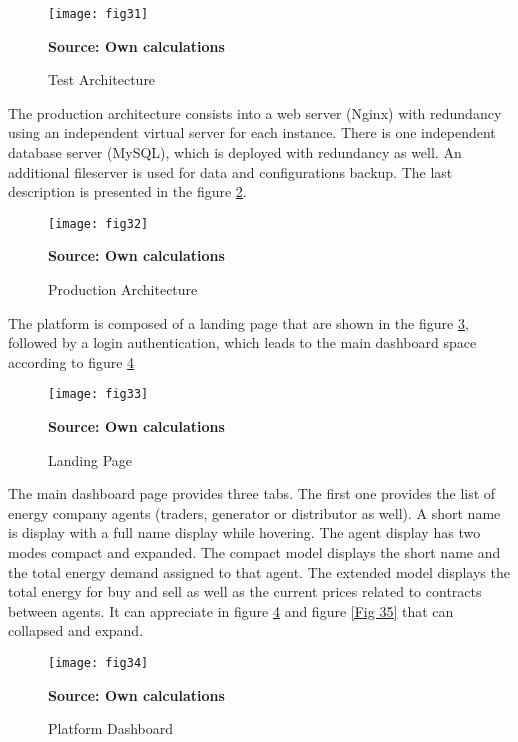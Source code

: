 \documentclass[12pt]{book}
\begin{document}
\begin{figure}  
\centering    
\texttt{[image: fig31]}  
\caption{Test Architecture}
\scriptsize 
\textbf{Source: Own calculations}
\captionsetup{justification=centering,margin=1cm}   
\label{Fig 31}
\end{figure}

The production architecture consists into a web server (Nginx) with redundancy using an independent virtual server for each instance. There is one independent database server (MySQL), which is deployed with redundancy as well. An additional fileserver is used for data and configurations backup. The last description is presented in the figure \ref{Fig 32}. 

\begin{figure}  
\centering    
\texttt{[image: fig32]}  
\caption{Production Architecture}
\scriptsize 
\textbf{Source: Own calculations}
\captionsetup{justification=centering,margin=1cm}   
\label{Fig 32}
\end{figure}

The platform is composed of a landing page that are shown in the figure \ref{Fig 33}, followed by a login authentication, which leads to the main dashboard space according to figure \ref{Fig 34}

\begin{figure}  
\centering    
\texttt{[image: fig33]}  
\caption{Landing Page}
\scriptsize 
\textbf{Source: Own calculations}
\captionsetup{justification=centering,margin=1cm}   
\label{Fig 33}
\end{figure}

The main dashboard page provides three tabs. The first one provides the list of energy company agents (traders, generator or distributor as well). A short name is display with a full name display while hovering. The agent display has two modes compact and expanded. The compact model displays the short name and the total energy demand assigned to that agent. The extended model displays the total energy for buy and sell as well as the current prices related to contracts between agents. It can appreciate in figure \ref{Fig 34} and figure \ref{Fig 35} that can collapsed and expand.

\begin{figure}  
\centering    
\texttt{[image: fig34]}  
\caption{Platform Dashboard}
\scriptsize 
\textbf{Source: Own calculations}
\captionsetup{justification=centering,margin=1cm}   
\label{Fig 34}
\end{figure}
\end{document}

